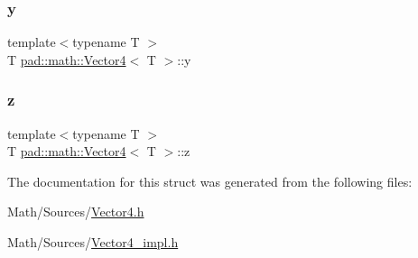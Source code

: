 \mbox{\label{structpad_1_1math_1_1_vector4_a2461711530968b1c7c5ff1256a5a6098}} 
\subsubsection{\texorpdfstring{y}{y}}
{\footnotesize\ttfamily template$<$typename T $>$ \\
T \mbox{\hyperlink{structpad_1_1math_1_1_vector4}{pad\+::math\+::\+Vector4}}$<$ T $>$\+::y}

\mbox{\label{structpad_1_1math_1_1_vector4_a9407faaccb5b094aeb3cadc36e71755e}} 
\subsubsection{\texorpdfstring{z}{z}}
{\footnotesize\ttfamily template$<$typename T $>$ \\
T \mbox{\hyperlink{structpad_1_1math_1_1_vector4}{pad\+::math\+::\+Vector4}}$<$ T $>$\+::z}



The documentation for this struct was generated from the following files\+:\begin{DoxyCompactItemize}
\item 
Math/\+Sources/\mbox{\hyperlink{_vector4_8h}{Vector4.\+h}}\item 
Math/\+Sources/\mbox{\hyperlink{_vector4__impl_8h}{Vector4\+\_\+impl.\+h}}\end{DoxyCompactItemize}
